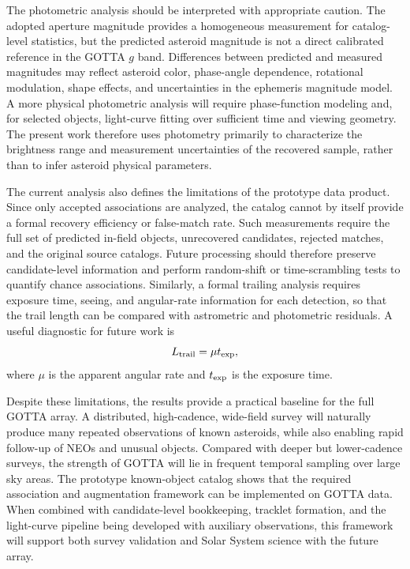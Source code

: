 \documentclass[referee]{raa}
\begin{document}
The photometric analysis should be interpreted with appropriate caution. The adopted aperture magnitude provides a homogeneous measurement for catalog-level statistics, but the predicted asteroid magnitude is not a direct calibrated reference in the GOTTA $g$ band. Differences between predicted and measured magnitudes may reflect asteroid color, phase-angle dependence, rotational modulation, shape effects, and uncertainties in the ephemeris magnitude model. A more physical photometric analysis will require phase-function modeling and, for selected objects, light-curve fitting over sufficient time and viewing geometry. The present work therefore uses photometry primarily to characterize the brightness range and measurement uncertainties of the recovered sample, rather than to infer asteroid physical parameters.

The current analysis also defines the limitations of the prototype data product. Since only accepted associations are analyzed, the catalog cannot by itself provide a formal recovery efficiency or false-match rate. Such measurements require the full set of predicted in-field objects, unrecovered candidates, rejected matches, and the original source catalogs. Future processing should therefore preserve candidate-level information and perform random-shift or time-scrambling tests to quantify chance associations. Similarly, a formal trailing analysis requires exposure time, seeing, and angular-rate information for each detection, so that the trail length can be compared with astrometric and photometric residuals. A useful diagnostic for future work is
\begin{equation}
L_{\rm trail}=\mu t_{\rm exp},
\end{equation}
where $\mu$ is the apparent angular rate and $t_{\rm exp}$ is the exposure time.

Despite these limitations, the results provide a practical baseline for the full GOTTA array. A distributed, high-cadence, wide-field survey will naturally produce many repeated observations of known asteroids, while also enabling rapid follow-up of NEOs and unusual objects. Compared with deeper but lower-cadence surveys, the strength of GOTTA will lie in frequent temporal sampling over large sky areas. The prototype known-object catalog shows that the required association and augmentation framework can be implemented on GOTTA data. When combined with candidate-level bookkeeping, tracklet formation, and the light-curve pipeline being developed with auxiliary observations, this framework will support both survey validation and Solar System science with the future array.
\end{document}
